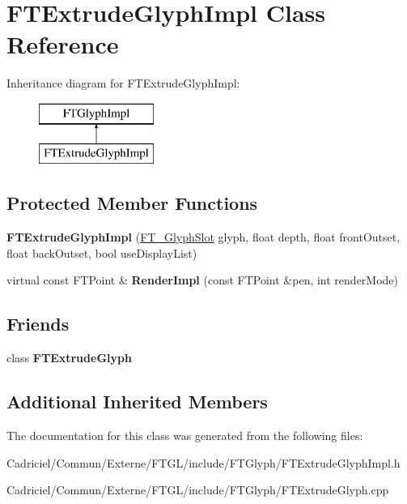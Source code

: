 \hypertarget{class_f_t_extrude_glyph_impl}{}\section{F\+T\+Extrude\+Glyph\+Impl Class Reference}
\label{class_f_t_extrude_glyph_impl}
Inheritance diagram for F\+T\+Extrude\+Glyph\+Impl\+:\begin{figure}[H]
\begin{center}
\leavevmode
\includegraphics[height=2.000000cm]{class_f_t_extrude_glyph_impl}
\end{center}
\end{figure}
\subsection*{Protected Member Functions}
\begin{DoxyCompactItemize}
\item 
{\bfseries F\+T\+Extrude\+Glyph\+Impl} (\hyperlink{struct_f_t___glyph_slot_rec__}{F\+T\+\_\+\+Glyph\+Slot} glyph, float depth, float front\+Outset, float back\+Outset, bool use\+Display\+List)\hypertarget{class_f_t_extrude_glyph_impl_adbfa8d05122539318f6caa8b77a5c291}{}\label{class_f_t_extrude_glyph_impl_adbfa8d05122539318f6caa8b77a5c291}

\item 
virtual const F\+T\+Point \& {\bfseries Render\+Impl} (const F\+T\+Point \&pen, int render\+Mode)\hypertarget{class_f_t_extrude_glyph_impl_a7ba3363d6764a14a6954f068f626029b}{}\label{class_f_t_extrude_glyph_impl_a7ba3363d6764a14a6954f068f626029b}

\end{DoxyCompactItemize}
\subsection*{Friends}
\begin{DoxyCompactItemize}
\item 
class {\bfseries F\+T\+Extrude\+Glyph}\hypertarget{class_f_t_extrude_glyph_impl_a43bdcab05c1db93d9474fee8176c1fb0}{}\label{class_f_t_extrude_glyph_impl_a43bdcab05c1db93d9474fee8176c1fb0}

\end{DoxyCompactItemize}
\subsection*{Additional Inherited Members}


The documentation for this class was generated from the following files\+:\begin{DoxyCompactItemize}
\item 
Cadriciel/\+Commun/\+Externe/\+F\+T\+G\+L/include/\+F\+T\+Glyph/F\+T\+Extrude\+Glyph\+Impl.\+h\item 
Cadriciel/\+Commun/\+Externe/\+F\+T\+G\+L/include/\+F\+T\+Glyph/F\+T\+Extrude\+Glyph.\+cpp\end{DoxyCompactItemize}
